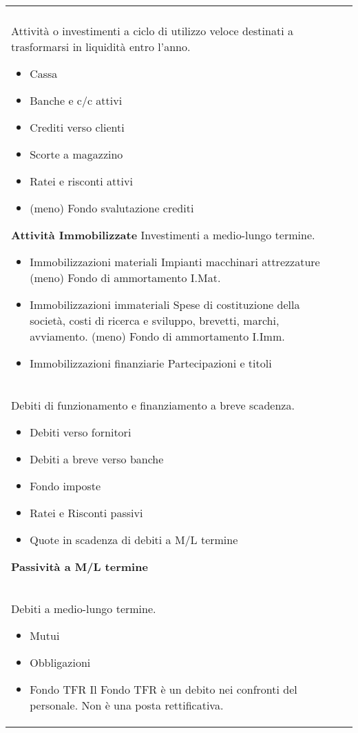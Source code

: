 \documentclass[a4paper,portrait,12pt]{article}
\theoremstyle{definition}
\begin{document}
\begin{table}[H]
\begin{center}
\begin{tabular}{ll}
\begin{minipage}[t]{.5\linewidth}
\textbf{Attività Circolanti}\\
Attività o investimenti a ciclo di utilizzo veloce
destinati a trasformarsi in liquidità entro l’anno.
\begin{itemize}
\item Cassa 
\item Banche e c/c attivi
\item Crediti verso clienti
\item Scorte a magazzino
\item Ratei e risconti attivi
\item (meno) Fondo svalutazione crediti
\end{itemize}

\textbf{Attività Immobilizzate}
Investimenti a medio-lungo termine.
\begin{itemize}
\item Immobilizzazioni materiali
Impianti macchinari attrezzature
(meno) Fondo di ammortamento I.Mat.
\item Immobilizzazioni immateriali
Spese di costituzione della società, costi di ricerca
e sviluppo, brevetti, marchi, avviamento.
(meno) Fondo di ammortamento I.Imm.
\item Immobilizzazioni finanziarie
Partecipazioni e titoli
\end{itemize}
\end{minipage}

&

\begin{minipage}[t]{.5\linewidth}
\textbf{Passività Circolanti}\\
Debiti di funzionamento e finanziamento a breve scadenza.
\begin{itemize}
\item Debiti verso fornitori
\item Debiti a breve verso banche
\item Fondo imposte
\item Ratei e Risconti passivi
\item Quote in scadenza di debiti a M/L termine
\end{itemize}

\textbf{Passività a M/L termine}\\
Debiti a medio-lungo termine.
\begin{itemize}
\item Mutui
\item Obbligazioni
\item Fondo TFR
Il Fondo TFR è un debito nei confronti del personale.
Non è una posta rettificativa.
\end{itemize}


\end{minipage}
\end{tabular}
\end{center}
\end{table}
\end{document}
